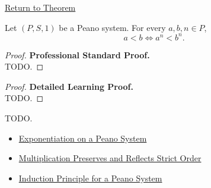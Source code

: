 \newpage
{}
\label{prf:powers-with-common-exponent-preserve-strict-order}

\begin{remark*}[Return]
\hyperref[thm:powers-with-common-exponent-preserve-strict-order]{Return to Theorem}
\end{remark*}

\begin{theorem*}
Let $(P,S,1)$ be a Peano system. For every $a,b,n \in P$,
\[
a<b
\Longleftrightarrow
a^n<b^n.
\]
\end{theorem*}

\begin{proof}
\textbf{Professional Standard Proof.}~\\
TODO.
\end{proof}

\begin{proof}
\textbf{Detailed Learning Proof.}~\\
TODO.
\end{proof}

\begin{remark*}
TODO.
\end{remark*}

\begin{dependencies}
\begin{itemize}
  \item \hyperref[def:exponentiation-on-peano-system]{Exponentiation on a Peano System}
  \item \hyperref[thm:multiplication-preserves-and-reflects-strict-order]{Multiplication Preserves and Reflects Strict Order}
  \item \hyperref[thm:induction-principle-for-peano-system]{Induction Principle for a Peano System}
\end{itemize}
\end{dependencies}
